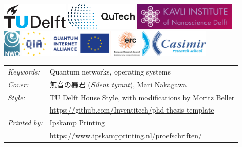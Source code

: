 \begin{titlepage}
\begin{center}
\noindent
\includegraphics[height=0.5in]{figures/logos/tudelft.pdf}
\hfill
\includegraphics[height=0.5in]{figures/logos/qutech.pdf}
\hfill
\includegraphics[height=0.5in]{figures/logos/kavli.pdf}
\\ \vspace{2\baselineskip}
\includegraphics[height=0.5in]{figures/logos/nwo.pdf}
\hfill
\includegraphics[height=0.5in]{figures/logos/qia.pdf}
\hfill
\includegraphics[height=0.5in]{figures/logos/erc.pdf}
\hfill
\includegraphics[height=0.5in]{figures/logos/casimir.pdf}
\end{center}

\vfill

\noindent
\begin{tabular}{@{}p{}@{}p{}}
    \textit{Keywords:} & Quantum networks, operating systems \\[\medskipamount]
    \textit{Cover:} & 無音の暴君 (\emph{Silent tyrant}), Mari Nakagawa \\[\medskipamount]
    \textit{Style:} & TU Delft House Style, with modifications by Moritz Beller \\
    & \url{https://github.com/Inventitech/phd-thesis-template} \\[\medskipamount]
    \textit{Printed by:} & Ipskamp Printing \\
    & \url{https://www.ipskampprinting.nl/proefschriften/} \\[\medskipamount]
\end{tabular}


\end{titlepage}

